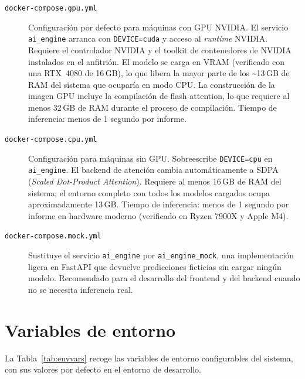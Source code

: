 \begin{description}
    \item[\texttt{docker-compose.gpu.yml}] Configuración por defecto para máquinas con GPU NVIDIA. El servicio \texttt{ai\_engine} arranca con \texttt{DEVICE=cuda} y acceso al \emph{runtime} NVIDIA. Requiere el controlador NVIDIA y el toolkit de contenedores de NVIDIA instalados en el anfitrión. El modelo se carga en VRAM (verificado con una RTX~4080 de 16\,GB), lo que libera la mayor parte de los \textasciitilde{}13\,GB de RAM del sistema que ocuparía en modo CPU. La construcción de la imagen GPU incluye la compilación de flash attention, lo que requiere al menos 32\,GB de RAM durante el proceso de compilación. Tiempo de inferencia: menos de 1 segundo por informe.

    \item[\texttt{docker-compose.cpu.yml}] Configuración para máquinas sin GPU. Sobreescribe \texttt{DEVICE=cpu} en \texttt{ai\_engine}. El backend de atención cambia automáticamente a SDPA (\emph{Scaled Dot-Product Attention}). Requiere al menos 16\,GB de RAM del sistema; el entorno completo con todos los modelos cargados ocupa aproximadamente 13\,GB. Tiempo de inferencia: menos de 1 segundo por informe en hardware moderno (verificado en Ryzen 7900X y Apple M4).

    \item[\texttt{docker-compose.mock.yml}] Sustituye el servicio \texttt{ai\_engine} por \texttt{ai\_engine\_mock}, una implementación ligera en FastAPI que devuelve predicciones ficticias sin cargar ningún modelo. Recomendado para el desarrollo del frontend y del backend cuando no se necesita inferencia real.
\end{description}

\section{Variables de entorno}

La Tabla~\ref{tab:envvars} recoge las variables de entorno configurables del sistema, con sus valores por defecto en el entorno de desarrollo.

